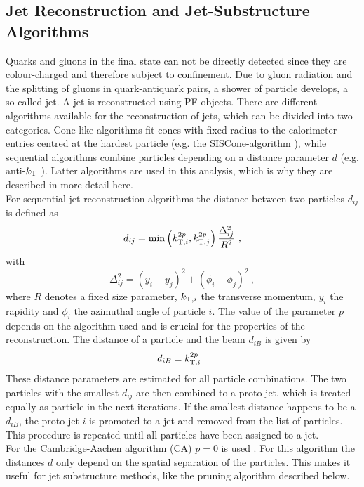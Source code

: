\subsection{Jet Reconstruction and Jet-Substructure Algorithms}
\label{sec:jetreco}
Quarks and gluons in the final state can not be directly detected since they are colour-charged and therefore subject to confinement. Due to gluon radiation and the splitting of gluons in quark-antiquark pairs, a shower of particle develops, a so-called jet. A jet is reconstructed using PF objects. There are different algorithms available for the reconstruction of jets, which can be divided into two categories. Cone-like algorithms fit cones with fixed radius to the calorimeter entries centred at the hardest particle (e.g. the SISCone-algorithm \cite{siscone}), while sequential algorithms combine particles depending on a distance parameter $d$ (e.g. anti-$k_{\rm T}$ \cite{antikt}). Latter algorithms are used in this analysis, which is why they are described in more detail here.\\

\noindent For sequential jet reconstruction algorithms the distance between two particles $d_{ij}$ is defined as
\begin{align}
d_{ij} = \min\left(k_{{\rm T},i}^{2p},k_{{\rm T},j}^{2p}\right)\frac{\Delta_{ij}^2}{R^2} ~,
\end{align}
with
\begin{equation}
\Delta_{ij}^2 = (y_i-y_j)^2 + (\phi_i - \phi_j)^2 ~, \label{eq:reco:deltar}
\end{equation}
where $R$ denotes a fixed size parameter, $k_{{\rm T},i}$ the transverse momentum, $y_i$ the rapidity and $\phi_i$ the azimuthal angle of particle $i$. The value of the parameter $p$ depends on the algorithm used and is crucial for the properties of the reconstruction. The distance of a particle and the beam $d_{iB}$ is given by
\begin{equation}
d_{iB} = k_{{\rm T},i}^{2p} ~.
\end{equation}
These distance parameters are estimated for all particle combinations. The two particles with the smallest $d_{ij}$ are then combined to a proto-jet, which is treated equally as particle in the next iterations. If the smallest distance happens to be a $d_{iB}$, the proto-jet $i$ is promoted to a jet and removed from the list of particles. This procedure is repeated until all particles have been assigned to a jet.\\

\noindent For the Cambridge-Aachen algorithm (CA) $p=0$ is used \cite{CAalgo}. For this algorithm the distances $d$ only depend on the spatial separation of the particles. This makes it useful for jet substructure methods, like the pruning algorithm described below.\\

